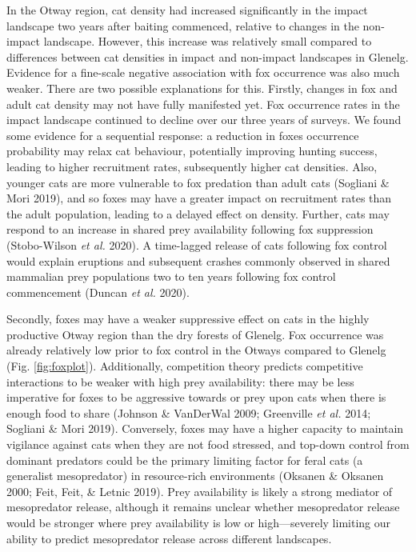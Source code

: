 \documentclass[preprint, 3p, authoryear]{elsarticle} %
\begin{document}
In the Otway region, cat density had increased significantly in the impact landscape two years after baiting commenced, relative to changes in the non-impact landscape. However, this increase was relatively small compared to differences between cat densities in impact and non-impact landscapes in Glenelg. Evidence for a fine-scale negative association with fox occurrence was also much weaker. There are two possible explanations for this. Firstly, changes in fox and adult cat density may not have fully manifested yet. Fox occurrence rates in the impact landscape continued to decline over our three years of surveys. We found some evidence for a sequential response: a reduction in foxes occurrence probability may relax cat behaviour, potentially improving hunting success, leading to higher recruitment rates, subsequently higher cat densities. Also, younger cats are more vulnerable to fox predation than adult cats (Sogliani \& Mori 2019), and so foxes may have a greater impact on recruitment rates than the adult population, leading to a delayed effect on density. Further, cats may respond to an increase in shared prey availability following fox suppression (Stobo-Wilson \emph{et al.} 2020). A time-lagged release of cats following fox control would explain eruptions and subsequent crashes commonly observed in shared mammalian prey populations two to ten years following fox control commencement (Duncan \emph{et al.} 2020).

Secondly, foxes may have a weaker suppressive effect on cats in the highly productive Otway region than the dry forests of Glenelg. Fox occurrence was already relatively low prior to fox control in the Otways compared to Glenelg (Fig. \ref{fig:foxplot}). Additionally, competition theory predicts competitive interactions to be weaker with high prey availability: there may be less imperative for foxes to be aggressive towards or prey upon cats when there is enough food to share (Johnson \& VanDerWal 2009; Greenville \emph{et al.} 2014; Sogliani \& Mori 2019). Conversely, foxes may have a higher capacity to maintain vigilance against cats when they are not food stressed, and top-down control from dominant predators could be the primary limiting factor for feral cats (a generalist mesopredator) in resource-rich environments (Oksanen \& Oksanen 2000; Feit, Feit, \& Letnic 2019). Prey availability is likely a strong mediator of mesopredator release, although it remains unclear whether mesopredator release would be stronger where prey availability is low or high---severely limiting our ability to predict mesopredator release across different landscapes.
\end{document}
